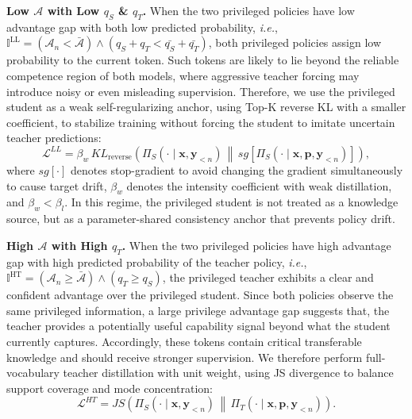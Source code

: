 \documentclass[]{jingdong}
\theoremstyle{plain}
\theoremstyle{definition}
\theoremstyle{remark}
\begin{document}
\noindent\textbf{Low $\mathcal{A}$ with Low $q_{S}$ \& $q_{T}$.}
When the two privileged policies have low advantage gap with both low predicted probability, \textit{i.e.}, $\mathbb{I}^{\mathrm{LL}}=\left(\mathcal{A}_{n}< \bar{\mathcal{A}} \right)\wedge \left(q_{S} + q_{T} < \bar{q_{S}}  + \bar{q_{T}}\right)$, both privileged policies assign low probability to the current token. 
Such tokens are likely to lie beyond the reliable competence region of both models, where aggressive teacher forcing may introduce noisy or even misleading supervision. 
Therefore, we use the privileged student as a weak self-regularizing anchor, using Top-K reverse KL with a smaller coefficient, to stabilize training without forcing the student to imitate uncertain teacher predictions:
\begin{equation}
    \mathcal{L}^{LL}
    =
    \beta_{w}\,
    KL_{\mathrm{reverse}}
    \left(
        \Pi_{S}\left(\cdot\mid \mathbf{x},\mathbf{y}_{<n}\right)
        \,\middle\|\,
        sg\left[
        \Pi_{S}\left(\cdot\mid \mathbf{x},\mathbf{p},\mathbf{y}_{<n}\right)
        \right]
    \right),
\end{equation}
where $sg[\cdot]$ denotes stop-gradient to avoid changing the gradient simultaneously to cause target drift, $\beta_{w}$ denotes the intensity coefficient with weak distillation, and $\beta_{w} < \beta_{l}$. In this regime, the privileged student is not treated as a knowledge source, but as a parameter-shared consistency anchor that prevents policy drift.



\noindent\textbf{High $\mathcal{A}$ with High $q_{T}$.}
When the two privileged policies have high advantage gap with high predicted probability of the teacher policy, \textit{i.e.}, $\mathbb{I}^{\mathrm{HT}}=\left(\mathcal{A}_{n} \geq \bar{\mathcal{A}} \right) \wedge \left(q_{T} \geq q_{S}\right)$, the privileged teacher exhibits a clear and confident advantage over the privileged student. 
Since both policies observe the same privileged information, a large privilege advantage gap suggests that, the teacher provides a potentially useful capability signal beyond what the student currently captures.
Accordingly, these tokens contain critical transferable knowledge and should receive stronger supervision. 
We therefore perform full-vocabulary teacher distillation with unit weight, using JS divergence to balance support coverage and mode concentration:
\begin{equation}
    \mathcal{L}^{HT}
    =
    JS
    \left(
        \Pi_{S}\left(\cdot\mid \mathbf{x},\mathbf{y}_{<n}\right)
        \,\middle\|\,
        \Pi_{T}\left(\cdot\mid \mathbf{x},\mathbf{p},\mathbf{y}_{<n}\right)
    \right).
\end{equation}
\end{document}
